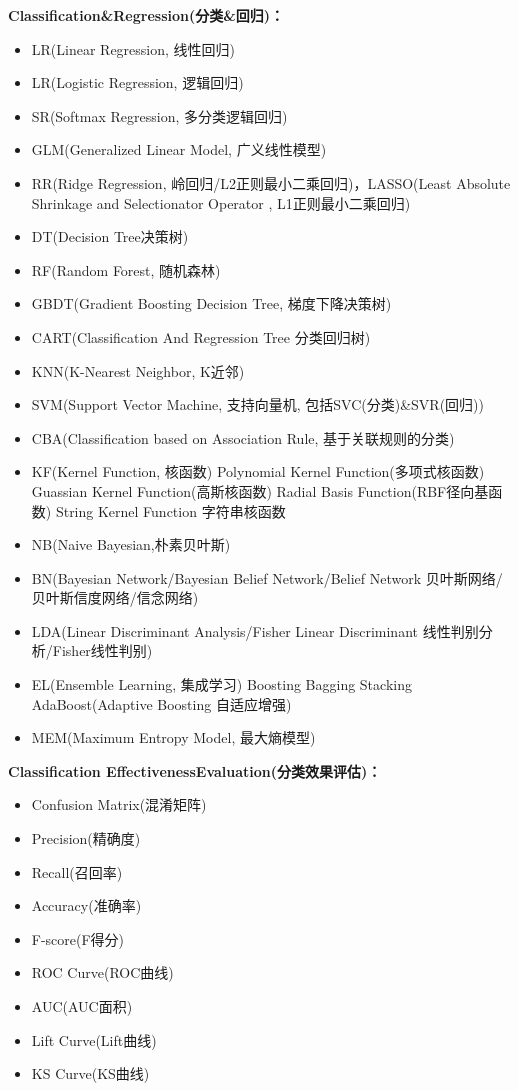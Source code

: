 \documentclass[10pt,a4paper]{ctexbook}
\begin{document}
\textbf{Classification\&Regression(分类\&回归)：}
\begin{itemize}
\item LR(Linear Regression, 线性回归)
\item LR(Logistic Regression, 逻辑回归)
\item SR(Softmax Regression, 多分类逻辑回归)
\item GLM(Generalized Linear Model, 广义线性模型)
\item RR(Ridge Regression, 岭回归/L2正则最小二乘回归)，LASSO(Least Absolute Shrinkage and Selectionator Operator , L1正则最小二乘回归)
\item DT(Decision Tree决策树)
\item RF(Random Forest, 随机森林)
\item GBDT(Gradient Boosting Decision Tree, 梯度下降决策树)
\item CART(Classification And Regression Tree 分类回归树)
\item KNN(K-Nearest Neighbor, K近邻)
\item SVM(Support Vector Machine, 支持向量机, 包括SVC(分类)\&SVR(回归))
\item CBA(Classification based on Association Rule, 基于关联规则的分类)
\item KF(Kernel Function, 核函数) 
    \subitem Polynomial Kernel Function(多项式核函数)
    \subitem Guassian Kernel Function(高斯核函数)
    \subitem Radial Basis Function(RBF径向基函数)
    \subitem String Kernel Function 字符串核函数
\item NB(Naive Bayesian,朴素贝叶斯)
\item BN(Bayesian Network/Bayesian Belief Network/Belief Network 贝叶斯网络/贝叶斯信度网络/信念网络)
\item LDA(Linear Discriminant Analysis/Fisher Linear Discriminant 线性判别分析/Fisher线性判别)
\item EL(Ensemble Learning, 集成学习) 
    \subitem Boosting
    \subitem Bagging
    \subitem Stacking
    \subitem AdaBoost(Adaptive Boosting 自适应增强)
\item MEM(Maximum Entropy Model, 最大熵模型)
\end{itemize}

\textbf{Classification EffectivenessEvaluation(分类效果评估)：}
\begin{itemize}
\item Confusion Matrix(混淆矩阵)
\item Precision(精确度)
\item Recall(召回率)
\item Accuracy(准确率)
\item F-score(F得分)
\item ROC Curve(ROC曲线)
\item AUC(AUC面积)
\item Lift Curve(Lift曲线)
\item KS Curve(KS曲线)
\end{itemize}
\end{document}
